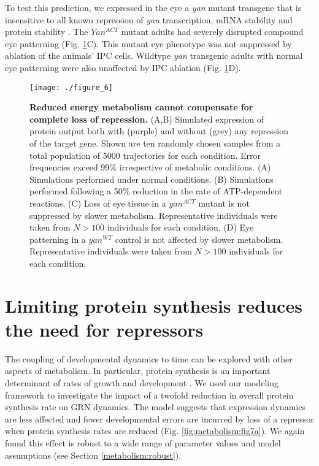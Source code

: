 To test this prediction, we expressed in the eye a \textit{yan} mutant transgene that is insensitive to all known repression of \textit{yan} transcription, mRNA stability and protein stability \cite{Rebay1995}. The $Yan^{ACT}$ mutant adults had severely disrupted compound eye patterning (Fig. \ref{fig:metabolism:fig6}C). This mutant eye phenotype was not suppressed by ablation of the animals' IPC cells. Wildtype \textit{yan} transgenic adults with normal eye patterning were also unaffected by IPC ablation (Fig. \ref{fig:metabolism:fig6}D).

\begin{figure}[h!]
\centering
\texttt{[image: ./figure\_6]}
\caption[Reduced metabolism cannot compensate for complete loss of repression.]{\textbf{Reduced energy metabolism cannot compensate for complete loss of repression.} (A,B) Simulated expression of protein output both with (purple) and without (grey) any repression of the target gene. Shown are ten randomly chosen samples from a total population of 5000 trajectories for each condition. Error frequencies exceed 99\% irrespective of metabolic conditions. (A) Simulations performed under normal conditions. (B) Simulations performed following a 50\% reduction in the rate of ATP-dependent reactions. (C) Loss of eye tissue in a $yan^{ACT}$ mutant is not suppressed by slower metabolism. Representative individuals were taken from $N>100$ individuals for each condition. (D) Eye patterning in a $yan^{WT}$ control is not affected by slower metabolism. Representative individuals were taken from $N>100$ individuals for each condition.}
\label{fig:metabolism:fig6}
\end{figure}

\section{Limiting protein synthesis reduces the need for repressors}

The coupling of developmental dynamics to time can be explored with other aspects of metabolism. In particular, protein synthesis is an important determinant of rates of growth and development \cite{Lempiainen2009}. We used our modeling framework to investigate the impact of a twofold reduction in overall protein synthesis rate on GRN dynamics. The model suggests that expression dynamics are less affected and fewer developmental errors are incurred by loss of a repressor when protein synthesis rates are reduced (Fig. \ref{fig:metabolism:fig7a}). We again found this effect is robust to a wide range of parameter values and model assumptions (see Section \ref{metabolism:robust}).

